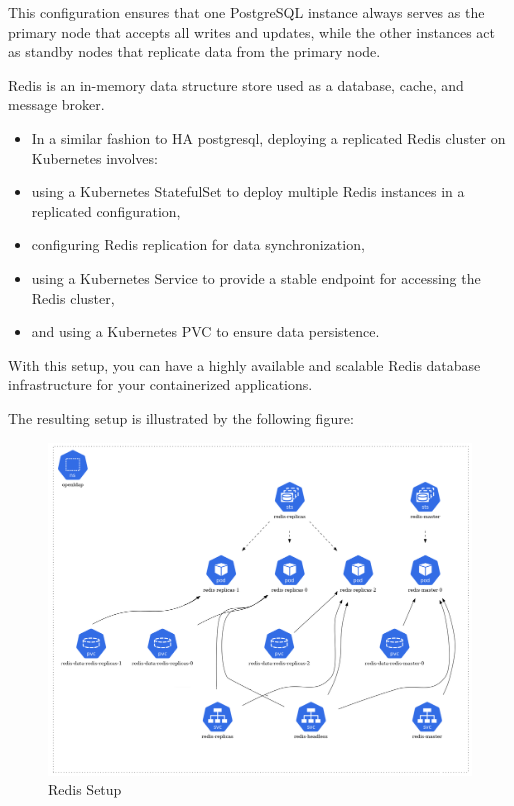 This configuration ensures that one PostgreSQL instance always serves as the primary node that accepts all writes and updates, while the other instances act as standby nodes that replicate data from the primary node. 


Redis is an in-memory data structure store used as a database, cache, and message broker. 
\begin{itemize}[label={--}]
\item In a similar fashion to HA postgresql, deploying a replicated Redis cluster on Kubernetes involves: 
\item using a Kubernetes StatefulSet to deploy multiple Redis instances in a replicated configuration, 
\item configuring Redis replication for data synchronization, 
\item using a Kubernetes Service to provide a stable endpoint for accessing the Redis cluster, 
\item and using a Kubernetes PVC to ensure data persistence. 
\end{itemize}
With this setup, you can have a highly available and scalable Redis database infrastructure for your containerized applications. 

The resulting setup is illustrated by the following figure: 

\begin{figure}[H]\centering
\includegraphics[width=1.0\textwidth,angle=00]{assets/f38.png}
\caption{Redis Setup }
\label{fig:Redis Setup}
\end{figure}

